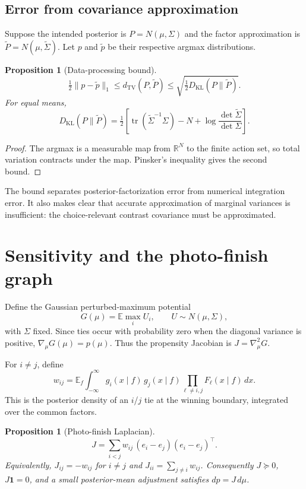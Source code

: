 \documentclass[11pt]{article}
\newtheorem{proposition}[theorem]{Proposition}
\newcommand{\E}{\mathbb{E}}
\newcommand{\R}{\mathbb{R}}
\newcommand{\ind}{\mathbf{1}}
\begin{document}
\subsection{Error from covariance approximation}

Suppose the intended posterior is $P = N(\mu, \Sigma)$ and the factor approximation is $\widetilde P = N(\mu, \widetilde\Sigma)$. Let $p$ and $\widetilde p$ be their respective argmax distributions.

\begin{proposition}[Data-processing bound]
\label{prop:dataprocessing}
\[
\tfrac12 \|p - \widetilde p\|_1
\le
d_{\mathrm{TV}}(P, \widetilde P)
\le
\sqrt{ \tfrac12 D_{\mathrm{KL}}(P \| \widetilde P) }.
\]
For equal means,
\[
D_{\mathrm{KL}}(P \| \widetilde P)
=
\tfrac12
\left[
\operatorname{tr}(\widetilde\Sigma^{-1} \Sigma) - N
+ \log \frac{\det \widetilde\Sigma}{\det \Sigma}
\right].
\]
\end{proposition}

\begin{proof}
The argmax is a measurable map from $\R^N$ to the finite action set, so total variation contracts under the map. Pinsker's inequality gives the second bound.
\end{proof}

The bound separates posterior-factorization error from numerical integration error. It also makes clear that accurate approximation of marginal variances is insufficient: the choice-relevant contrast covariance must be approximated.

\section{Sensitivity and the photo-finish graph}
\label{sec:photofinish}

Define the Gaussian perturbed-maximum potential
\[
G(\mu) = \E \max_i U_i,
\qquad
U \sim N(\mu, \Sigma),
\]
with $\Sigma$ fixed. Since ties occur with probability zero when the diagonal variance is positive, $\nabla_\mu G(\mu) = p(\mu)$. Thus the propensity Jacobian is $J = \nabla_\mu^2 G$.

For $i \ne j$, define
\[
w_{ij}
=
\E_f \int_{-\infty}^{\infty}
g_i(x \mid f)\, g_j(x \mid f)
\prod_{\ell \ne i,j} F_\ell(x \mid f)\, dx.
\]
This is the posterior density of an $i$/$j$ tie at the winning boundary, integrated over the common factors.

\begin{proposition}[Photo-finish Laplacian]
\label{prop:laplacian}
\[
J = \sum_{i < j} w_{ij}\, (e_i - e_j)(e_i - e_j)^\top.
\]
Equivalently, $J_{ij} = -w_{ij}$ for $i \ne j$ and $J_{ii} = \sum_{j \ne i} w_{ij}$. Consequently $J \succeq 0$, $J \ind = 0$, and a small posterior-mean adjustment satisfies $dp = J\, d\mu$.
\end{proposition}
\end{document}
